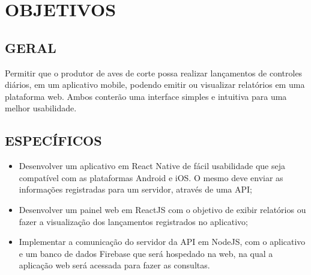 
\chapter{OBJETIVOS}
\label{chap:objetivos}

\section{GERAL}
\label{subsec:objgeral}
Permitir que o produtor de aves de corte possa realizar lançamentos de controles diários, em um aplicativo mobile, podendo emitir ou visualizar relatórios em uma plataforma web. Ambos conterão uma interface simples e intuitiva para uma melhor usabilidade.



\section{ESPECÍFICOS}
\label{subsec:objesp}

\begin{itemize}
   \item Desenvolver um aplicativo em React Native de fácil usabilidade que seja compatível com as plataformas Android e iOS. O mesmo deve enviar as informações registradas para um servidor, através de uma API;
    \item Desenvolver um painel web em ReactJS com o objetivo de exibir relatórios ou fazer a visualização dos lançamentos registrados no aplicativo;
   \item Implementar a comunicação do servidor da API em NodeJS, com o aplicativo e um banco de dados Firebase que será hospedado na web, na qual a aplicação web será acessada para fazer as consultas.

 \end{itemize}






